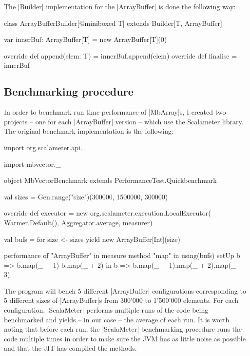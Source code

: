 The |Builder| implementation for the |ArrayBuffer| is done the following way:

\begin{lstlisting-nobreak}
class ArrayBufferBuilder[@miniboxed T] extends Builder[T, ArrayBuffer] {

  var innerBuf: ArrayBuffer[T] = new ArrayBuffer[T](0)

  override def append(elem: T) = innerBuf.append(elem)
  override def finalise = innerBuf
}
\end{lstlisting-nobreak}

\subsection{Benchmarking procedure}

In order to benchmark run time performance of |MbArray|s, I created two projects -- one for each |ArrayBuffer| version -- which use the Scalameter library. The original benchmark implementation is the following:

\begin{lstlisting-nobreak}
import org.scalameter.api._

import mbvector._

object MbVectorBenchmark extends PerformanceTest.Quickbenchmark {
  val sizes = Gen.range("size")(300000, 1500000, 300000)

  override def executor = new org.scalameter.execution.LocalExecutor(
    Warmer.Default(),
    Aggregator.average,
    measurer)

  val bufs = for {
    size <- sizes
  } yield new ArrayBuffer[Int](size)

  performance of "ArrayBuffer" in {
    measure method "map" in {
      using(bufs) setUp {
        b => 
          b.map(_ + 1)
          b.map(_ + 2)
      } in {
        b => b.map(_ + 1).map(_ + 2).map(_ + 3)
      }
    }
  }
}
\end{lstlisting-nobreak}

The program will bench 5 different |ArrayBuffer| configurations corresponding to 5 different sizes of |ArrayBuffer|s from 300'000 to 1'500'000 elements. For each configuration, |ScalaMeter| performs multiple runs of the code being benchmarked and yields -- in our case -- the average of each run. It is worth noting that before each run, the |ScalaMeter| benchmarking procedure runs the code multiple times in order to make sure the JVM has as little noise as possible and that the JIT has compiled the methods.

